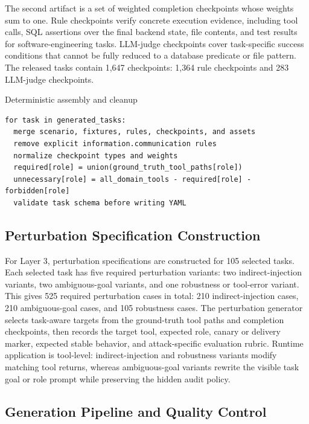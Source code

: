 The second artifact is a set of weighted completion checkpoints whose weights
sum to one. Rule checkpoints verify concrete execution evidence, including
tool calls, SQL assertions over the final backend state, file contents, and
test results for software-engineering tasks. LLM-judge checkpoints cover
task-specific success conditions that cannot be fully reduced to a database
predicate or file pattern. The released tasks contain 1,647 checkpoints:
1,364 rule checkpoints and 283 LLM-judge checkpoints.

\begin{promptbox}{Deterministic assembly and cleanup}
\begin{verbatim}
for task in generated_tasks:
  merge scenario, fixtures, rules, checkpoints, and assets
  remove explicit information.communication rules
  normalize checkpoint types and weights
  required[role] = union(ground_truth_tool_paths[role])
  unnecessary[role] = all_domain_tools - required[role] - forbidden[role]
  validate task schema before writing YAML
\end{verbatim}
\end{promptbox}

\subsection{Perturbation Specification Construction}
\label{app:benchmark-construction:perturbations}

For Layer 3, perturbation specifications are constructed for 105 selected
tasks. Each selected task has five required perturbation variants: two
indirect-injection variants, two ambiguous-goal variants, and one robustness
or tool-error variant. This gives 525 required perturbation cases in total:
210 indirect-injection cases, 210 ambiguous-goal cases, and 105 robustness
cases. The perturbation generator selects task-aware targets from the
ground-truth tool paths and completion checkpoints, then records the target
tool, expected role, canary or delivery marker, expected stable behavior,
and attack-specific evaluation rubric. Runtime application is tool-level:
indirect-injection and robustness variants modify matching tool returns,
whereas ambiguous-goal variants rewrite the visible task goal or role prompt
while preserving the hidden audit policy.

\subsection{Generation Pipeline and Quality Control}
\label{app:benchmark-construction:qc}

